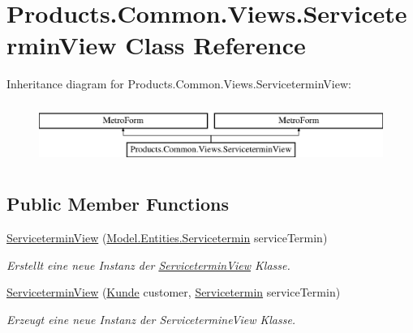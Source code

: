 \hypertarget{class_products_1_1_common_1_1_views_1_1_servicetermin_view}{}\section{Products.\+Common.\+Views.\+Servicetermin\+View Class Reference}
\label{class_products_1_1_common_1_1_views_1_1_servicetermin_view}
Inheritance diagram for Products.\+Common.\+Views.\+Servicetermin\+View\+:\begin{figure}[H]
\begin{center}
\leavevmode
\includegraphics[height=2.000000cm]{class_products_1_1_common_1_1_views_1_1_servicetermin_view}
\end{center}
\end{figure}
\subsection*{Public Member Functions}
\begin{DoxyCompactItemize}
\item 
\hyperlink{class_products_1_1_common_1_1_views_1_1_servicetermin_view_ae5b7fb433a2940708ae8363d07f5604b}{Servicetermin\+View} (\hyperlink{class_products_1_1_model_1_1_entities_1_1_servicetermin}{Model.\+Entities.\+Servicetermin} service\+Termin)
\begin{DoxyCompactList}\small\item\em Erstellt eine neue Instanz der \hyperlink{class_products_1_1_common_1_1_views_1_1_servicetermin_view}{Servicetermin\+View} Klasse. \end{DoxyCompactList}\item 
\hyperlink{class_products_1_1_common_1_1_views_1_1_servicetermin_view_a9b9c38bc025eb09a05f0a7ff42a80366}{Servicetermin\+View} (\hyperlink{class_products_1_1_model_1_1_entities_1_1_kunde}{Kunde} customer, \hyperlink{class_products_1_1_model_1_1_entities_1_1_servicetermin}{Servicetermin} service\+Termin)
\begin{DoxyCompactList}\small\item\em Erzeugt eine neue Instanz der Servicetermine\+View Klasse. \end{DoxyCompactList}\end{DoxyCompactItemize}
